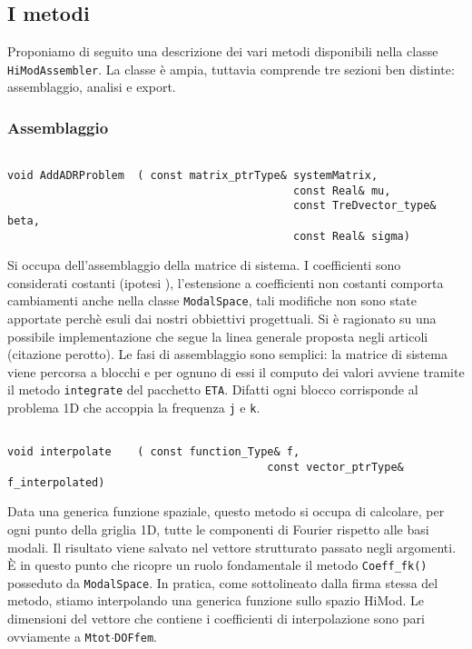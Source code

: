 \subsection{I metodi}
Proponiamo di seguito una descrizione dei vari metodi disponibili nella classe \texttt{HiModAssembler}. La classe \`e ampia, tuttavia comprende tre sezioni ben distinte: assemblaggio, analisi e export.
\subsubsection{Assemblaggio}
\begin{lstlisting}[style=general, frame = top]

void AddADRProblem	( const matrix_ptrType& systemMatrix,
											const Real& mu, 
											const TreDvector_type& beta, 
											const Real& sigma)
\end{lstlisting}
Si occupa dell'assemblaggio della matrice di sistema. I coefficienti sono considerati costanti (ipotesi ), l'estensione a coefficienti non costanti comporta cambiamenti anche nella classe \texttt{ModalSpace}, tali modifiche non sono state apportate perch\`e esuli dai nostri obbiettivi progettuali. Si \`e ragionato su una possibile implementazione che segue la linea generale proposta negli articoli (citazione perotto).
Le fasi di assemblaggio sono semplici: la matrice di sistema viene percorsa a blocchi e per ognuno di essi il computo dei valori avviene tramite il metodo \texttt{integrate} del pacchetto \texttt{ETA}. Difatti ogni blocco corrisponde al problema 1D che accoppia la frequenza \texttt{j} e \texttt{k}.

\begin{lstlisting}[style = general, frame = top]

void interpolate	( const function_Type& f,
										const vector_ptrType& f_interpolated)
\end{lstlisting}
Data una generica funzione spaziale, questo metodo si occupa di calcolare, per ogni punto della griglia 1D, tutte le componenti di Fourier rispetto alle basi modali. Il risultato viene salvato nel vettore strutturato passato negli argomenti. \`E in questo punto che ricopre un ruolo fondamentale il metodo \texttt{Coeff\_fk()} posseduto da \texttt{ModalSpace}.
In pratica, come sottolineato dalla firma stessa del metodo, stiamo interpolando una generica funzione sullo spazio HiMod. Le dimensioni del vettore che contiene i coefficienti di interpolazione sono pari ovviamente a \texttt{Mtot$\cdot$DOFfem}.

